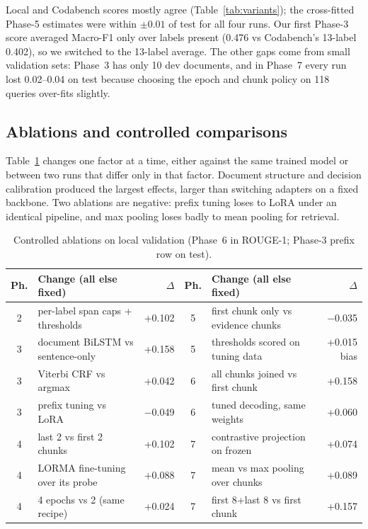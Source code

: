 \documentclass[11pt, oneside]{article}
\begin{document}
Local and Codabench scores mostly agree (Table~\ref{tab:variants}); the cross-fitted Phase-5 estimates were within $\pm0.01$ of test for all four runs. Our first Phase-3 score averaged Macro-F1 only over labels present (0.476 vs Codabench's 13-label 0.402), so we switched to the 13-label average. The other gaps come from small validation sets: Phase~3 has only 10 dev documents, and in Phase~7 every run lost 0.02--0.04 on test because choosing the epoch and chunk policy on 118 queries over-fits slightly.


\subsection{Ablations and controlled comparisons}
Table~\ref{tab:abl} changes one factor at a time, either against the same trained model or between two runs that differ only in that factor. Document structure and decision calibration produced the largest effects, larger than switching adapters on a fixed backbone. Two ablations are negative: prefix tuning loses to LoRA under an identical pipeline, and max pooling loses badly to mean pooling for retrieval.

\begin{table}[t]
\centering\footnotesize\setlength{\tabcolsep}{4pt}
\caption{Controlled ablations on local validation (Phase~6 in ROUGE-1; Phase-3 prefix row on test).}\label{tab:abl}
\begin{tabular}{clr|clr}\toprule
Ph. & Change (all else fixed) & $\Delta$ & Ph. & Change (all else fixed) & $\Delta$ \\\midrule
2 & per-label span caps + thresholds & +0.102 & 5 & first chunk only vs evidence chunks & $-$0.035 \\
3 & document BiLSTM vs sentence-only & +0.158 & 5 & thresholds scored on tuning data & +0.015 bias \\
3 & Viterbi CRF vs argmax & +0.042 & 6 & all chunks joined vs first chunk & +0.158 \\
3 & prefix tuning vs LoRA & $-$0.049 & 6 & tuned decoding, same weights & +0.060 \\
4 & last 2 vs first 2 chunks & +0.102 & 7 & contrastive projection on frozen \C & +0.074 \\
4 & LORMA fine-tuning over its probe & +0.088 & 7 & mean vs max pooling over chunks & +0.089 \\
4 & 4 epochs vs 2 (same recipe) & +0.024 & 7 & first 8+last 8 vs first chunk & +0.157 \\\bottomrule
\end{tabular}
\end{table}
\end{document}
